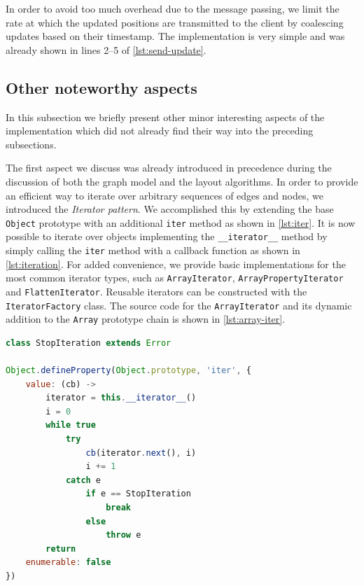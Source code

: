 In order to avoid too much overhead due to the message passing, we limit the rate at which the updated positions are transmitted to the client by coalescing updates based on their timestamp. The implementation is very simple and was already shown in lines 2--5 of \vref{lst:send-update}.

\subsection{Other noteworthy aspects}
\label{sec:visu/implementation/other}

In this subsection we briefly present other minor interesting aspects of the implementation which did not already find their way into the preceding subsections.

The first aspect we discuss was already introduced in precedence during the discussion of both the graph model and the layout algorithms. In order to provide an efficient way to iterate over arbitrary sequences of edges and nodes, we introduced the \emph{Iterator pattern}. We accomplished this by extending the base \texttt{Object} prototype with an additional \texttt{iter} method as shown in \vref{lst:iter}. It is now possible to iterate over objects implementing the \texttt{\_\_iterator\_\_} method by simply calling the \texttt{iter} method with a callback function as shown in \vref{lst:iteration}. For added convenience, we provide basic implementations for the most common iterator types, such as \texttt{ArrayIterator}, \texttt{ArrayPropertyIterator} and \texttt{FlattenIterator}. Reusable iterators can be constructed with the \texttt{IteratorFactory} class. The source code for the \texttt{ArrayIterator} and its dynamic addition to the \texttt{Array} prototype chain is shown in \vref{lst:array-iter}.

\begin{lstlisting}[caption={Extension of the base prototype with the \texttt{iter} method.},label=lst:iter,language=javascript]
class StopIteration extends Error

Object.defineProperty(Object.prototype, 'iter', {
    value: (cb) ->
        iterator = this.__iterator__()
        i = 0
        while true
            try
                cb(iterator.next(), i)
                i += 1
            catch e
                if e == StopIteration
                    break
                else
                    throw e
        return
    enumerable: false
})
\end{lstlisting}


